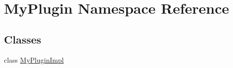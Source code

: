 \hypertarget{namespace_my_plugin}{\section{My\-Plugin Namespace Reference}
\label{namespace_my_plugin}
}
\subsection*{Classes}
\begin{DoxyCompactItemize}
\item 
class \hyperlink{class_my_plugin_1_1_my_plugin_impl}{My\-Plugin\-Impl}
\end{DoxyCompactItemize}
